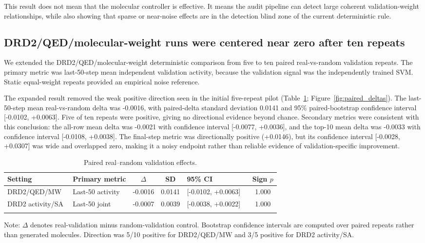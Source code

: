 \documentclass[referee,lineno,pdflatex,sn-basic]{sn-jnl}
\theoremstyle{thmstyleone}%
\theoremstyle{thmstyletwo}%
\theoremstyle{thmstylethree}%
\begin{document}
This result does not mean that the molecular controller is effective. It means the audit pipeline can detect large coherent validation-weight relationships, while also showing that sparse or near-noise effects are in the detection blind zone of the current deterministic rule.

\subsection{DRD2/QED/molecular-weight runs were centered near zero after ten repeats}\label{subsec:drd2_qed_mw}

We extended the DRD2/QED/molecular-weight deterministic comparison from five to ten paired real-vs-random validation repeats. The primary metric was last-50-step mean independent validation activity, because the validation signal was the independently trained SVM. Static equal-weight repeats provided an empirical noise reference.

The expanded result removed the weak positive direction seen in the initial five-repeat pilot (Table~\ref{tab:paired}; Figure~\ref{fig:paired_deltas}). The last-50-step mean real-vs-random delta was -0.0016, with paired-delta standard deviation 0.0141 and 95\% paired-bootstrap confidence interval [-0.0102, +0.0063]. Five of ten repeats were positive, giving no directional evidence beyond chance. Secondary metrics were consistent with this conclusion: the all-row mean delta was -0.0021 with confidence interval [-0.0077, +0.0036], and the top-10 mean delta was -0.0033 with confidence interval [-0.0108, +0.0038]. The final-step metric was directionally positive (+0.0146), but its confidence interval [-0.0028, +0.0307] was wide and overlapped zero, making it a noisy endpoint rather than reliable evidence of validation-specific improvement.

\begin{table}[h]
\caption{Paired real--random validation effects.}
\label{tab:paired}
\centering
\footnotesize
\setlength{\tabcolsep}{4pt}
\renewcommand{\arraystretch}{1.15}
\begin{tabularx}{\linewidth}{@{}p{0.24\linewidth}p{0.22\linewidth}ccp{0.24\linewidth}c@{}}
\toprule
Setting & Primary metric & $\Delta$ & SD & 95\% CI & Sign $p$ \\
\midrule
DRD2/QED/MW
& Last-50 activity
& -0.0016
& 0.0141
& [-0.0102, +0.0063]
& 1.000 \\

DRD2 activity/SA
& Last-50 joint
& -0.0007
& 0.0039
& [-0.0038, +0.0022]
& 1.000 \\
\botrule
\end{tabularx}

\vspace{2pt}
\raggedright
\footnotesize
Note: $\Delta$ denotes real-validation minus random-validation control. Bootstrap confidence intervals are computed over paired repeats rather than generated molecules. Direction was 5/10 positive for DRD2/QED/MW and 3/5 positive for DRD2 activity/SA.
\end{table}
\end{document}
